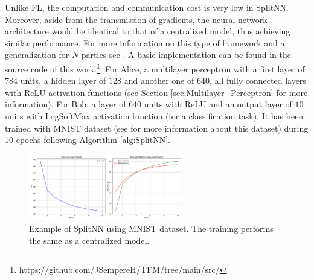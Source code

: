 Unlike FL, the computation and communication cost is very low in SplitNN. Moreover, aside from the transmission of gradients, the neural network architecture would be identical to that of a centralized model, thus achieving similar performance. For more information on this type of framework and a generalization for $N$ parties see \cite{gupta2018}.
A basic implementation can be found in the source code of this work.\footnote{https://github.com/JSempereH/TFM/tree/main/src/}. For Alice, a multilayer perceptron with a first layer of $784$ units, a hidden layer of $128$ and another one of $640$, all fully connected layers with ReLU activation functions (see Section \ref{sec:Multilayer_Perceptron} for more information). For Bob, a layer of $640$ units with ReLU and an output layer of $10$ units with LogSoftMax activation function (for a classification task). It has been trained with MNIST dataset (see \cite{deng2012} for more information about this dataset) during 10 epochs following Algorithm \ref{alg:SplitNN}.
\begin{figure}[H]
  \centering
  \includegraphics[width=0.6\textwidth]{figures/3-Vertical_Machine_Learning/MNIST_metrics_SplitNN.png}
  \caption{Example of SplitNN using MNIST dataset. The training performs the same as a centralized model.}
  \label{fig:MNIST_SplitNN_Metrics}
\end{figure}
